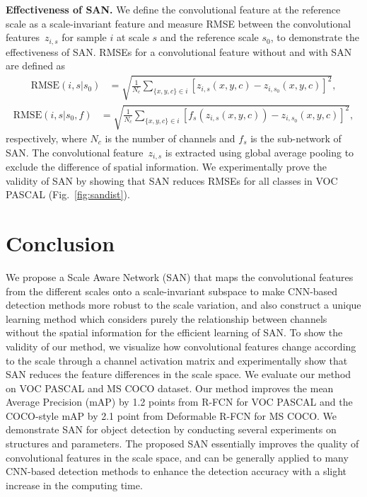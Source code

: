 \documentclass[runningheads]{llncs}
\begin{document}
\noindent
\textbf{Effectiveness of SAN.}
We define the convolutional feature at the reference scale as a scale-invariant feature and measure RMSE between the convolutional features~$z_{i,s}$ for sample $i$ at scale $s$ and the reference scale $s_0$, to demonstrate the effectiveness of SAN.
RMSEs for a convolutional feature without and with SAN are defined as 
\\
\begin{equation}
\begin{aligned}
\text{RMSE}(i,s|s_0) 		 &= \sqrt{ \frac{1}{N_c} \sum _ {\{x,y,c\} \in i}  \left[ z_{i,s}(x,y,c) - z_{i,s_0}(x,y,c)  \right] ^2 }, 
\end{aligned}
\end{equation}
\begin{equation}
\begin{aligned}
\text{RMSE}(i,s|s_0,f) &= \sqrt{ \frac{1}{N_c} \sum_ {\{x,y,c\} \in i}  \left[ f_{s} ( z_{i,s}(x,y,c) ) - z_{i,s_0}(x,y,c)  \right] ^2 }, 
\end{aligned}
\end{equation}
respectively, where $N_c$ is the number of channels and $f_{s}$ is the sub-network of SAN. 
The convolutional feature~$z_{i,s}$ is extracted using global average pooling to exclude the difference of spatial information.
We experimentally prove the validity of SAN by showing that SAN reduces RMSEs for all classes in VOC PASCAL (Fig.~\ref{fig:sandist}).


\section{Conclusion}
We propose a Scale Aware Network (SAN) that maps the convolutional features from the different scales onto a scale-invariant subspace to make CNN-based detection methods more robust to the scale variation, and also construct a unique learning method which considers purely the relationship between channels without the spatial information for the efficient learning of SAN.
To show the validity of our method, we visualize how convolutional features change according to the scale through a channel activation matrix and experimentally show that SAN reduces the feature differences in the scale space.
We evaluate our method on VOC PASCAL and MS COCO dataset.
Our method improves the mean Average Precision (mAP) by 1.2 points from R-FCN for VOC PASCAL 
and the COCO-style mAP by 2.1 point from Deformable R-FCN for MS COCO.
We demonstrate SAN for object detection by conducting several experiments on structures and parameters.	
The proposed SAN essentially improves the quality of convolutional features in the scale space, and can be generally applied to many CNN-based detection methods to enhance the detection accuracy with a slight increase in the computing time. 
\end{document}
